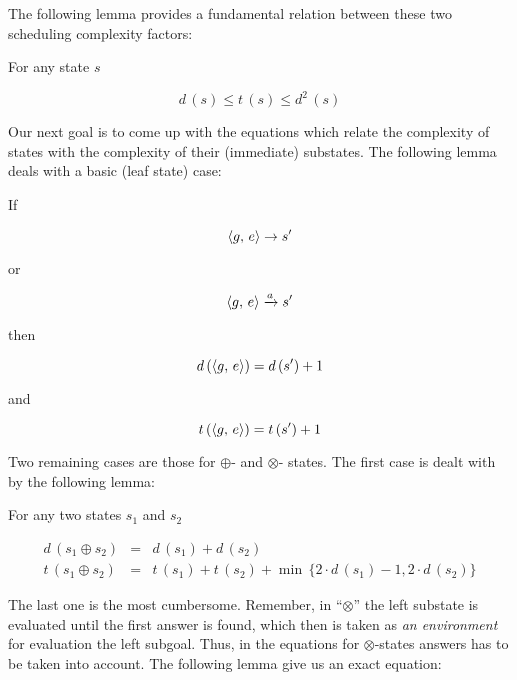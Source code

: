 The following lemma provides a fundamental relation between these two scheduling complexity factors:

\begin{lemma}
  For any state $s$

  \[
  d\,(s) \le t\,(s) \le d^2\,(s)
  \]
  
\end{lemma}

Our next goal is to come up with the equations which relate the complexity of states with the complexity of their
(immediate) substates. The following lemma deals with a basic (leaf state) case:

\begin{lemma}
  If

  \[\langle g ,\, e \rangle \rightarrow s^\prime\]

  or

  \[\langle g ,\, e \rangle \xrightarrow{a} s^\prime\]

  then

  \[d\,(\langle g ,\, e \rangle) = d\,(s^\prime) + 1\]

  and

  \[t\,(\langle g ,\, e \rangle) = t\,(s^\prime) + 1\]
\end{lemma}

Two remaining cases are those for $\oplus$- and $\otimes$- states. The first case is dealt with by the following lemma:

\begin{lemma}
For any two states $s_1$ and $s_2$

\[
\begin{array}{rcl}
  d\,(s_1 \oplus s_2) &=& d\,(s_1) + d\,(s_2) \\

  t\,(s_1 \oplus s_2) &=& t\,(s_1) + t\,(s_2) + \min\,\{2\cdot d\,(s_1) - 1, 2\cdot d\,(s_2)\}
\end{array}
\]

\end{lemma}

The last one is the most cumbersome. Remember, in ``$\otimes$'' the left substate is evaluated until the first answer is found, which
then is taken as \emph{an environment} for evaluation the left subgoal. Thus, in the equations for $\otimes$-states answers
has to be taken into account. The following lemma give us an exact equation:

